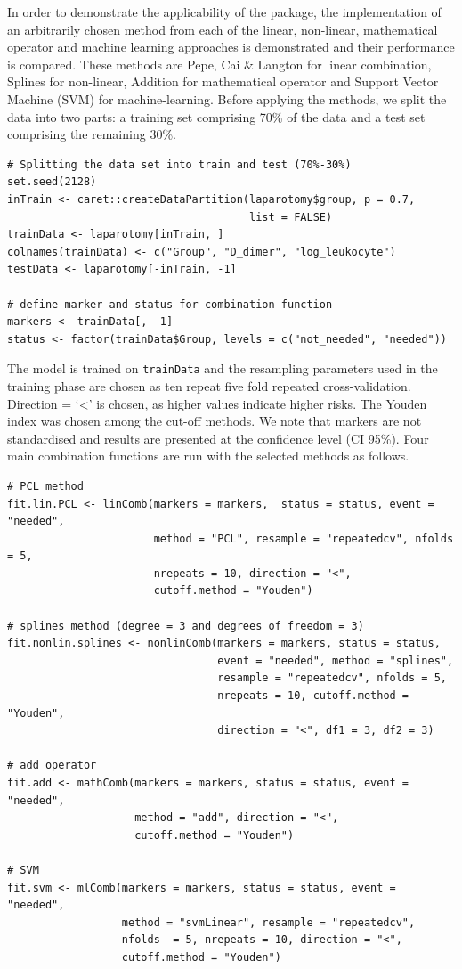 In order to demonstrate the applicability of the  package, the implementation of an arbitrarily chosen method from each of the linear, non-linear, mathematical operator and machine learning approaches is demonstrated and their performance is compared. These methods are Pepe, Cai \& Langton for linear combination, Splines for non-linear, Addition for mathematical operator and Support Vector Machine (SVM) for machine-learning. Before applying the methods, we split the data into two parts: a training set comprising 70\% of the data and a test set comprising the remaining 30\%.

\begin{verbatim}
# Splitting the data set into train and test (70%-30%)
set.seed(2128)
inTrain <- caret::createDataPartition(laparotomy$group, p = 0.7,
                                      list = FALSE)
trainData <- laparotomy[inTrain, ]
colnames(trainData) <- c("Group", "D_dimer", "log_leukocyte")
testData <- laparotomy[-inTrain, -1]

# define marker and status for combination function
markers <- trainData[, -1]
status <- factor(trainData$Group, levels = c("not_needed", "needed"))
\end{verbatim}

The model is trained on \texttt{trainData} and the resampling parameters used in the training phase are chosen as ten repeat five fold repeated cross-validation. Direction = `\textless{}' is chosen, as higher values indicate higher risks. The Youden index was chosen among the cut-off methods. We note that markers are not standardised and results are presented at the confidence level (CI 95\%). Four main combination functions are run with the selected methods as follows.

\begin{verbatim}
# PCL method
fit.lin.PCL <- linComb(markers = markers,  status = status, event = "needed",
                       method = "PCL", resample = "repeatedcv", nfolds = 5,
                       nrepeats = 10, direction = "<",
                       cutoff.method = "Youden")

# splines method (degree = 3 and degrees of freedom = 3)
fit.nonlin.splines <- nonlinComb(markers = markers, status = status,
                                 event = "needed", method = "splines",
                                 resample = "repeatedcv", nfolds = 5,
                                 nrepeats = 10, cutoff.method = "Youden",
                                 direction = "<", df1 = 3, df2 = 3)

# add operator
fit.add <- mathComb(markers = markers, status = status, event = "needed",
                    method = "add", direction = "<",
                    cutoff.method = "Youden")

# SVM
fit.svm <- mlComb(markers = markers, status = status, event = "needed",
                  method = "svmLinear", resample = "repeatedcv",
                  nfolds  = 5, nrepeats = 10, direction = "<",
                  cutoff.method = "Youden")
\end{verbatim}

